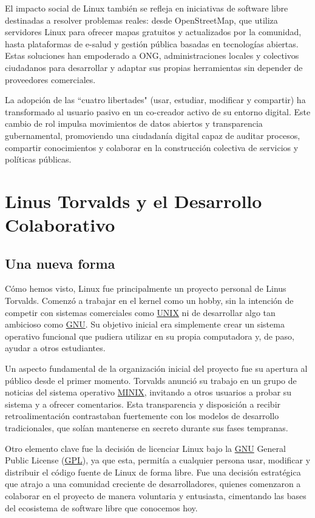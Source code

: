 \documentclass[a4paper,12pt]{article}
\begin{document}
El impacto social de Linux también se refleja en iniciativas de software libre
destinadas a resolver problemas reales: desde OpenStreetMap, que utiliza
servidores Linux para ofrecer mapas gratuitos y actualizados por la comunidad,
hasta plataformas de e-salud y gestión pública basadas en tecnologías abiertas.
Estas soluciones han empoderado a ONG, administraciones locales y colectivos 
ciudadanos para desarrollar y adaptar sus propias herramientas sin depender de
proveedores comerciales.

La adopción de las ``cuatro libertades" (usar, estudiar, modificar y compartir)
ha transformado al usuario pasivo en un co-creador activo de su entorno digital.
Este cambio de rol impulsa movimientos de datos abiertos y transparencia
gubernamental, promoviendo una ciudadanía digital capaz de auditar procesos,
compartir conocimientos y colaborar en la construcción colectiva de servicios y
políticas públicas.

\section{Linus Torvalds y el Desarrollo Colaborativo}

\subsection{Una nueva forma}

Cómo hemos visto, Linux fue principalmente un proyecto personal de Linus Torvalds.
Comenzó a trabajar en el kernel como un hobby, sin la intención de competir con
sistemas comerciales como \hyperref[unix]{UNIX} ni de desarrollar algo tan ambicioso como \hyperref[gnu]{GNU}. Su
objetivo inicial era simplemente crear un sistema operativo funcional que
pudiera utilizar en su propia computadora y, de paso, ayudar a otros
estudiantes.

Un aspecto fundamental de la organización inicial del proyecto fue su apertura
al público desde el primer momento. Torvalds anunció su trabajo en un grupo de
noticias del sistema operativo \hyperref[minix]{MINIX}, invitando a otros usuarios a probar su
sistema y a ofrecer comentarios. Esta transparencia y disposición a recibir
retroalimentación contrastaban fuertemente con los modelos de desarrollo
tradicionales, que solían mantenerse en secreto durante sus fases tempranas.

Otro elemento clave fue la decisión de licenciar Linux bajo la \hyperref[gnu]{GNU} General
Public License (\hyperref[gpl]{GPL}), ya que esta, permitía a cualquier persona usar, modificar
y distribuir el código fuente de Linux de forma libre. Fue una decisión
estratégica que atrajo a una comunidad creciente de desarrolladores, quienes
comenzaron a colaborar en el proyecto de manera voluntaria y entusiasta,
cimentando las bases del ecosistema de software libre que conocemos hoy.
\end{document}
